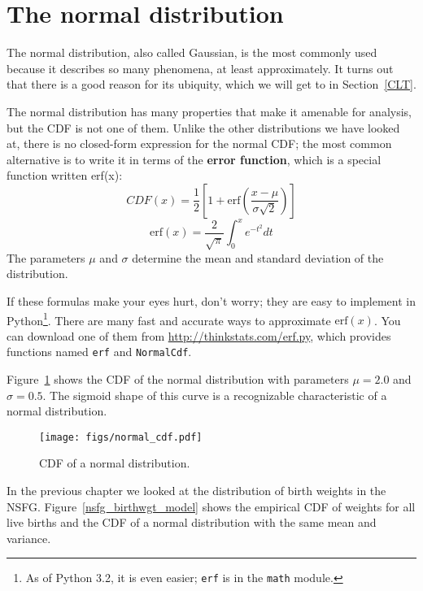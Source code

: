 \documentclass[12pt]{book}
\begin{document}
\section{The normal distribution}
\label{normal}

\newcommand{\erf}{\mathrm{erf}}

The normal distribution, also called Gaussian, is the most commonly
used because it describes so many phenomena, at least approximately.
It turns out that there is a good reason for its ubiquity, which we
will get to in Section~\ref{CLT}.

The normal distribution has many properties that make it amenable for
analysis, but the CDF is not one of them.  Unlike the
other distributions we have looked at, there is no closed-form
expression for the normal CDF; the most common alternative is to write
it in terms of the {\bf error function}, which is a special function
written erf(x):
%
\[ CDF(x) = \frac{1}{2} \left[ 1 +
  \erf \left( \frac{x - \mu}{\sigma \sqrt{2}} \right) \right] \]
%
\[ \erf(x) = \frac{2}{\sqrt{\pi}} \int_{0}^x e^{-t^2} dt \]
%
The parameters $\mu$ and $\sigma$ determine the mean and standard
deviation of the distribution.

If these formulas make your eyes hurt, don't worry; they are easy to
implement in Python\footnote{As of Python 3.2, it is even easier; 
{\tt erf} is in the {\tt math} module.}.  There are many fast and
accurate ways to approximate $\erf(x)$.  You can download one of them
from \url{http://thinkstats.com/erf.py}, which provides functions named
{\tt erf} and {\tt NormalCdf}.

Figure~\ref{normal_cdf} shows the CDF of the normal distribution
with parameters $\mu = 2.0$ and $\sigma = 0.5$.  The sigmoid shape of
this curve is a recognizable characteristic of a normal distribution.

\begin{figure}
\centerline{\texttt{[image: figs/normal\_cdf.pdf]}}
\caption{CDF of a normal distribution.}
\label{normal_cdf}
\end{figure}

In the previous chapter we looked at the distribution of birth
weights in the NSFG.  Figure~\ref{nsfg_birthwgt_model} shows the
empirical CDF of weights for all live births and the CDF of
a normal distribution with the same mean and variance.
\end{document}
